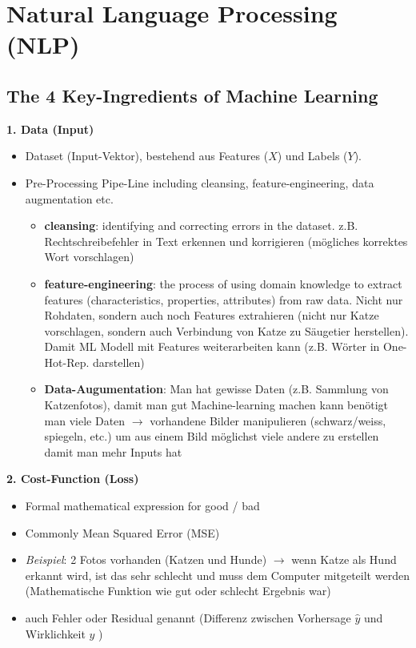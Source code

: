 \section{Natural Language Processing (NLP)}
\subsection{The 4 Key-Ingredients of Machine Learning}
\textbf{1. Data (Input)}
\begin{itemize}
    \item Dataset (Input-Vektor), bestehend aus Features ($X$) und Labels ($Y$).
    \item Pre-Processing Pipe-Line including cleansing, feature-engineering, data augmentation etc.
    \begin{itemize}
        \item \textbf{cleansing}: identifying and correcting errors in the dataset. z.B. Rechtschreibefehler in Text erkennen und korrigieren (mögliches korrektes Wort vorschlagen)
        \item \textbf{feature-engineering}: the process of using domain knowledge to extract features (characteristics, properties, attributes) from raw data. Nicht nur Rohdaten, sondern auch noch Features extrahieren (nicht nur Katze vorschlagen, sondern auch Verbindung von Katze zu Säugetier herstellen). Damit ML Modell mit Features weiterarbeiten kann (z.B. Wörter in One-Hot-Rep. darstellen)
        \item \textbf{Data-Augumentation}: Man hat gewisse Daten (z.B. Sammlung von Katzenfotos), damit man gut Machine-learning machen kann benötigt man viele Daten $\rightarrow$ vorhandene Bilder manipulieren (schwarz/weiss, spiegeln, etc.) um aus einem Bild möglichst viele andere zu erstellen damit man mehr Inputs hat
    \end{itemize}
\end{itemize}
\textbf{2. Cost-Function (Loss)}
\begin{itemize}
    \item Formal mathematical expression for good / bad
    \item Commonly Mean Squared Error (MSE)
    \item \textit{Beispiel}: 2 Fotos vorhanden (Katzen und Hunde) $\rightarrow$ wenn Katze als Hund erkannt wird, ist das sehr schlecht und muss dem Computer mitgeteilt werden (Mathematische Funktion wie gut oder schlecht Ergebnis war)
    \item auch Fehler oder Residual genannt (Differenz zwischen Vorhersage $\hat{y}$ und Wirklichkeit $y$ )
\end{itemize}
